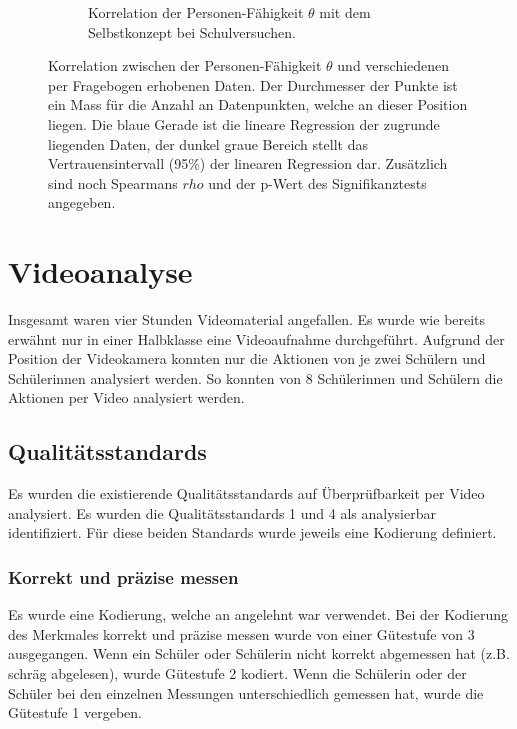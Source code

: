 \begin{figure}[htbp]
\begin{subfigure}{0.49\textwidth}
    \caption{Korrelation der Personen-Fähigkeit $\theta$ mit dem Selbstkonzept bei Schulversuchen.}
    \label{fig:corPersonenSelbskonzept}
  \end{subfigure}
 \caption{Korrelation zwischen der Personen-Fähigkeit $\theta$ und verschiedenen per Fragebogen erhobenen Daten. Der Durchmesser der Punkte ist ein Mass für die Anzahl an Datenpunkten, welche an dieser Position liegen. Die blaue Gerade ist die lineare Regression der zugrunde liegenden Daten, der dunkel graue Bereich stellt das Vertrauensintervall (95\%) der linearen Regression dar. Zusätzlich sind noch Spearmans $rho$ und der p-Wert des Signifikanztests angegeben.}
 \label{fig:corPersonen}
 \end{figure}
 
 \clearpage
 \section{Videoanalyse}
 
 Insgesamt waren vier Stunden Videomaterial angefallen. Es wurde wie bereits erwähnt nur in einer Halbklasse eine Videoaufnahme durchgeführt. Aufgrund der Position der Videokamera konnten nur die Aktionen von je zwei Schülern und Schülerinnen analysiert werden. So konnten von 8 Schülerinnen und Schülern die Aktionen per Video analysiert werden.
 
 \subsection{Qualitätsstandards}
 
 Es wurden die existierende Qualitätsstandards auf Überprüfbarkeit per Video analysiert. Es wurden die Qualitätsstandards 1 und 4 als analysierbar identifiziert. Für diese beiden Standards wurde jeweils eine Kodierung definiert.
 
 \subsubsection{Korrekt und präzise messen}
 
 Es wurde eine Kodierung, welche an \citet{Schreiber2012} angelehnt war verwendet. Bei der Kodierung des Merkmales korrekt und präzise messen wurde von einer Gütestufe von 3 ausgegangen. Wenn ein Schüler oder Schülerin nicht korrekt abgemessen hat (z.B. schräg abgelesen), wurde Gütestufe 2 kodiert. Wenn die Schülerin oder der Schüler bei den einzelnen Messungen unterschiedlich gemessen hat, wurde die Gütestufe 1 vergeben.
 
